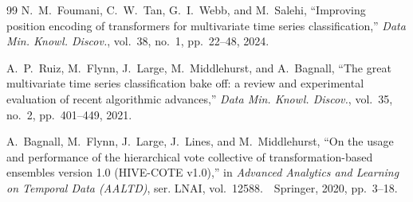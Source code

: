 \documentclass[conference,compsoc]{IEEEtran}
\begin{document}
\begin{thebibliography}{99}
N.~M.~Foumani, C.~W.~Tan, G.~I.~Webb, and M.~Salehi,
``Improving position encoding of transformers for multivariate time
series classification,''
\emph{Data Min. Knowl. Discov.}, vol.~38, no.~1, pp.~22--48, 2024.

A.~P.~Ruiz, M.~Flynn, J.~Large, M.~Middlehurst, and A.~Bagnall,
``The great multivariate time series classification bake off: a review
and experimental evaluation of recent algorithmic advances,''
\emph{Data Min. Knowl. Discov.}, vol.~35, no.~2, pp.~401--449, 2021.

A.~Bagnall, M.~Flynn, J.~Large, J.~Lines, and M.~Middlehurst,
``On the usage and performance of the hierarchical vote collective of
transformation-based ensembles version 1.0 ({HIVE-COTE} v1.0),''
in \emph{Advanced Analytics and Learning on Temporal Data (AALTD)},
ser. LNAI, vol.~12588.\ \ Springer, 2020, pp.~3--18.

\end{thebibliography}
\end{document}
